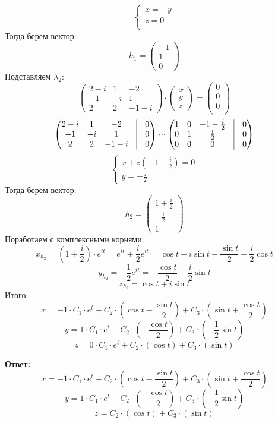 \documentclass[a4paper,12pt]{article}
\begin{document}
\[
\begin{cases}
x = - y\\
z = 0 \\
\end{cases}
\]
Тогда берем вектор:
\[
h_1 = 
\begin{pmatrix}
-1 \\
1 \\
0
\end{pmatrix}
\]
Подставляем $\lambda_2$:
\[
\begin{pmatrix}
2 - i& 1 & -2 \\
-1 & -i& 1 \\
2 & 2 & -1 - i
\end{pmatrix}
\cdot
\begin{pmatrix}
x \\
y \\ 
z
\end{pmatrix}
=
\begin{pmatrix}
0 \\
0 \\ 
0 \\
\end{pmatrix}
\]
\[
\begin{pmatrix}
2 - i& 1 & -2 & \vrule & 0  \\
-1 & -i& 1 & \vrule & 0 \\
2 & 2 & -1 - i & \vrule & 0
\end{pmatrix}
\sim
\begin{pmatrix}
1 & 0& -1 - \frac{i}{2} & \vrule & 0  \\
0 & 1& \frac{1}{2}& \vrule & 0 \\
0 & 0 & 0 & \vrule & 0
\end{pmatrix}
\]
\[
\begin{cases}
x + z(-1 - \frac{i}{2}) = 0 \\
y = - \frac{z}{2}
\end{cases}
\]
Тогда берем вектор:
\[
h_2 = 
\begin{pmatrix}
1 + \frac{i}{2} \\
- \frac{1}{2} \\
1
\end{pmatrix}
\]
Поработаем с комплексными корнями:
\[
x_{h_2} = \left(1 + \frac{i}{2}\right) \cdot e^{it}= e^{it} + \frac{i}{2}e^{it} = \cos t + i \sin t - \frac{\sin t}{2} + \frac{i}{2} \cos t
\]
\[
y_{h_2} = -\frac{1}{2} e^{it} = - \frac{\cos t}{2} - \frac{i}{2} \sin t
\]
\[
z_{h_2} = \cos t + i \sin t
\]
Итого:
\[
x = -1 \cdot C_1  \cdot e^{t} + C_2 \cdot \left(\cos t - \frac{\sin t}{2}\right) + C_3 \cdot \left(
\sin t + \frac{\cos t}{2}
\right)
\]
\[
y = 1 \cdot C_1 \cdot e^t + C_2 \cdot \left(
-\frac{\cos t}{2}
\right) 
+ C_3 \cdot \left(
-\frac{1}{2} \sin t
\right) 
\]
\[
z = 0 \cdot C_1 \cdot e^t + C_2 \cdot \left(
\cos t
\right) 
+ C_3 \cdot \left(
\sin t
\right) 
\]
\begin{center}
\textbf{Ответ: } 
\[
x = -1 \cdot C_1  \cdot e^{t} + C_2 \cdot \left(\cos t - \frac{\sin t}{2}\right) + C_3 \cdot \left(
\sin t + \frac{\cos t}{2}
\right)
\]
\[
y = 1 \cdot C_1 \cdot e^t + C_2 \cdot \left(
-\frac{\cos t}{2}
\right) 
+ C_3 \cdot \left(
-\frac{1}{2} \sin t
\right)
\]
\[
z = C_2 \cdot \left(
\cos t
\right) 
+ C_3 \cdot \left(
\sin t
\right)
\]
\end{center}
\clearpage
\end{document}
